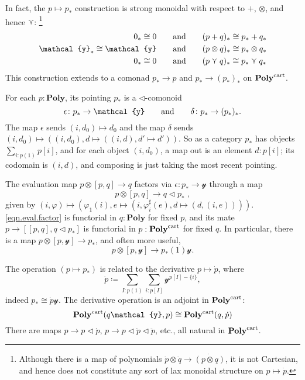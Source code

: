 \documentclass[11pt, one side, article]{memoir}
\theoremstyle{definition}
\theoremstyle{plain}
\newcommand{\Cat}[1]{\mathbf{#1}}%
\newcommand{\tn}[1]{\textnormal{#1}}
\newcommand{\yon}{{\mathcal{y}}}
\newcommand{\poly}{\Cat{Poly}}
\newcommand{\polycart}{\poly^{\tn{cart}}}
\newcommand{\0}{\textsf{0}}
\newcommand{\1}{\tn{\textsf{1}}}
\newcommand{\tri}{\mathbin{\triangleleft}}
\newcommand{\hh}[2][]{#1 \tn{#2} #1}
\newcommand{\qqand}{\hh[\qquad]{and}}
\newcommand{\OR}{\curlyvee}
\begin{document}
In fact, the $p\mapsto p_*$ construction is strong monoidal with respect to $+$, $\otimes$, and hence $\OR$:%
\footnote{Although there is a map of polynomials $\dot{p}\otimes\dot{q}\to\dot{(p\otimes q)}$, it is not Cartesian, and hence does not constitute any sort of lax monoidal structure on $p\mapsto\dot{p}$.}
\begin{align}
	0_*\cong 0
	&\qqand
	(p+q)_*\cong p_*+q_*\\
	\yon_*\cong\yon
	&\qqand
	(p\otimes q)_*\cong p_*\otimes q_*\\
	0_*\cong0
	&\qqand
	(p\OR q)_*\cong p_*\OR q_*
\end{align}
This construction extends to a comonad $p_*\to p$ and $p_*\to (p_*)_*$ on $\polycart$. 

For each $p:\poly$, its pointing $p_*$ is a $\tri$-comonoid
\begin{equation}
	\epsilon\colon p_*\to\yon
	\qqand
	\delta\colon p_*\to (p_*)_*.
\end{equation}
The map $\epsilon$ sends $(i,d_0)\mapsto d_0$ and the map $\delta$ sends $(i,d_0)\mapsto((i,d_0), d\mapsto ((i,d), d'\mapsto d'))$. So as a category $p_*$ has objects $\sum_{i:p(1)}p[i]$, and for each object $(i,d_0)$, a map out is an element $d:p[i]$; its codomain is $(i,d)$, and composing is just taking the most recent pointing.

The evaluation map $p\otimes [p,q]\to q$ factors via $\epsilon\colon p_*\to \yon$ through a map
\begin{equation}\label{eqn.eval.factor}
	p\otimes [p,q]\to q\tri p_*\;,
\end{equation}
given by $(i,\varphi)\mapsto (\varphi_1(i),e\mapsto(i,\varphi^\sharp_i(e),d\mapsto(d,(i,e))))$. \cref{eqn.eval.factor} is functorial in $q:\poly$ for fixed $p$, and its mate $p\to[[p,q],q\tri p_*]$ is functorial in $p:\polycart$ for fixed $q$. In particular, there is a map $p\otimes[p,\yon]\to p_*$, and often more useful,
\begin{equation}
	p\otimes [p,\yon]\to p_*(1)\yon.
\end{equation}

The operation $(p\mapsto p_*)$ is related to the derivative $p\mapsto\dot{p}$, where
\begin{equation}
\dot{p}\coloneqq\sum_{I:p(1)}\sum_{i:p[I]}\yon^{p[I]-\{i\}},
\end{equation}
indeed $p_*\cong\dot{p}\yon$. The derivative operation is an adjoint in $\polycart$:
\begin{equation}
  \polycart(q\yon,p)\cong
  \polycart(q,\dot{p})
\end{equation}
There are maps $p\to p\tri\dot{p}$, $p\to p\tri\dot{p}\tri\ddot{p}$, etc., all natural in $\polycart$. 
\end{document}
